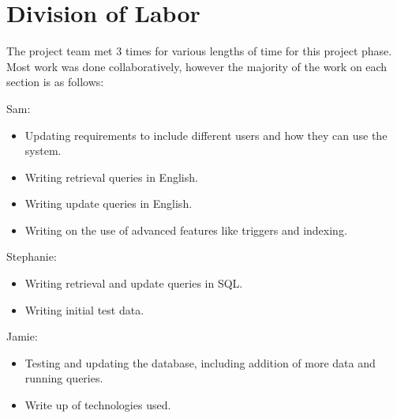 \documentclass{article}
\begin{document}
\section{}

\section{Division of Labor}
The project team met 3 times for various lengths of time for this project phase. Most work was done collaboratively,
however the majority of the work on each section is as follows:

Sam:
\begin{itemize}
\item Updating requirements to include different users and how they can use the system.
\item Writing retrieval queries in English.
\item Writing update queries in English.
\item Writing on the use of advanced features like triggers and indexing.
\end{itemize}

Stephanie:
\begin{itemize}
\item Writing retrieval and update queries in SQL.
\item Writing initial test data.
\end{itemize}

Jamie:
\begin{itemize}
\item Testing and updating the database, including addition of more data and running queries.
\item Write up of technologies used.
\end{itemize}

\section{}
\end{document}
